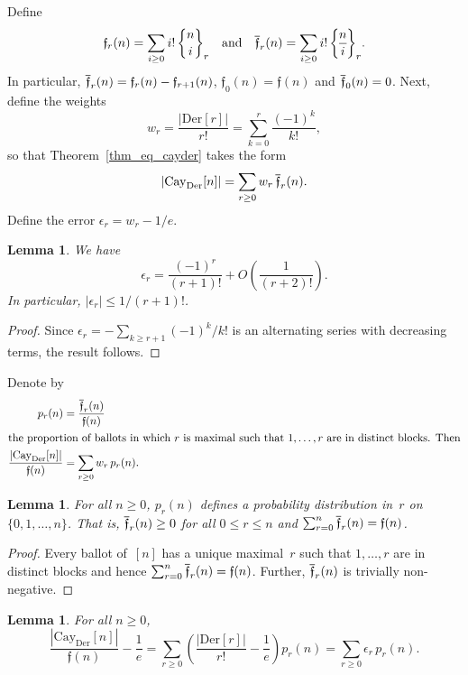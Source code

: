 \documentclass[a4paper,11pt,UKenglish]{article}
\newcommand{\Der}{\mathrm{Der}}
\newcommand{\Cay}{\mathrm{Cay}}
\newcommand{\stirl}[3]{\genfrac{\{}{\}}{0pt}{}{{#1}}{{#2}}_{{#3}}}
\newcommand{\sdiff}[3]{\genfrac{\{}{\}}{}{}{{#1}}{{#2}}_{{#3}}}
\newcommand{\fub}[1]{\mathfrak{f}(#1)}
\newcommand{\rfub}[2]{\mathfrak{f}_{#2}(#1)}
\newcommand{\sfub}[2]{%
  \overset{\raisebox{-0.2ex}{\rule{0.41em}{0.05em}}}%
  {\mathfrak{f}}_{#2}(#1)}
\newcommand{\CayDer}{\Cay_{\Der}}
\newtheorem{lemma}[theorem]{Lemma}
\theoremstyle{definition}
\begin{document}
Define
\[
  \rfub{n}{r} = \sum_{i \geq 0} i!\, \stirl{n}{i}{r}
  \quad\text{and}\quad
  \sfub{n}{r} = \sum_{i \geq 0} i!\, \sdiff{n}{i}{r}.
\]
In particular, $\sfub{n}{r} = \rfub{n}{r} - \rfub{n}{r+1}$,
$\rfub{n}{0}=\fub{n}$ and $\sfub{n}{0} = 0$. Next, define the weights
\[
  w_r = \frac{|\Der[r]|}{r!} = \sum_{k=0}^{r} \frac{(-1)^k}{k!},
\]
so that Theorem~\ref{thm_eq_cayder} takes the form
\[
  |\CayDer[n]| = \sum_{r\ge 0} w_r\,\sfub{n}{r}.
\]
Define the error $\epsilon_r = w_r - 1/e$.
\begin{lemma}\label{lem:dererr}
  We have
  \[
    \epsilon_r = \frac{(-1)^r}{(r+1)!}
    + O\!\left(\frac{1}{(r+2)!}\right).
  \]
  In particular, $|\epsilon_r| \leq 1/(r+1)!$.
\end{lemma}
\begin{proof}
  Since $\epsilon_r = -\sum_{k \geq r+1} (-1)^k/k!$ is an alternating
  series with decreasing terms, the result follows.
\end{proof}

Denote by\vspace{-1ex}
\begin{align}
  p_r(n) &= \frac{\sfub{n}{r}}{\fub{n}}\nonumber \\
  \intertext{the proportion of ballots in which $r$ is maximal
  such that $1,\ldots,r$ are in distinct blocks. Then}
  \frac{|\CayDer[n]|}{\fub{n}} &= \sum_{r \geq 0} w_r\, p_r(n). \label{eq:prop_of_cayder}
\end{align}

\begin{lemma}\label{lem:fubini}
For all $n \geq 0$,
$p_r(n)$ defines a probability distribution in~$r$
on~$\{0, 1, \ldots, n\}$. That is,
$\sfub{n}{r} \geq 0$ for all $0\le r\le n$ and
$\sum_{r=0}^{n} \sfub{n}{r} = \fub{n}$.
\end{lemma}

\begin{proof}
  Every ballot of~$[n]$ has a unique maximal~$r$ such that
  $1, \ldots, r$ are in distinct blocks and hence
  $\sum_{r=0}^{n} \sfub{n}{r} = \fub{n}$. Further, $\sfub{n}{r}$ is
  trivially non-negative.
\end{proof}

\begin{lemma}\label{lem:error}
For all $n \geq 0$,
\[
  \frac{|\CayDer[n]|}{\fub{n}} - \frac{1}{e}
  = \sum_{r \geq 0} \left(\frac{|\Der[r]|}{r!} - \frac{1}{e}\right) p_r(n)
  = \sum_{r \geq 0} \epsilon_r\, p_r(n).
\]
\end{lemma}
\end{document}

